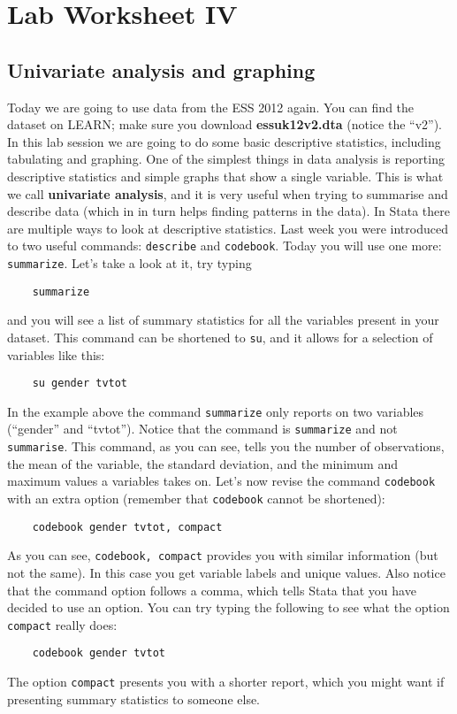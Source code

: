 \documentclass{article}
\begin{document}
\section*{\hfil Lab Worksheet IV \hfil}
\subsection*{Univariate analysis and graphing}

Today we are going to use data from the ESS 2012 again. You can find the dataset on LEARN; make sure you download \textbf{essuk12v2.dta} (notice the ``v2''). In this lab session we are going to do some basic descriptive statistics, including tabulating and graphing. One of the simplest things in data analysis is reporting descriptive statistics and simple graphs that show a single variable. This is what we call \textbf{univariate analysis}, and it is very useful when trying to summarise and describe data (which in in turn helps finding patterns in the data). In Stata there are multiple ways to look at descriptive statistics. Last week you were introduced to two useful commands: \texttt{describe} and \texttt{codebook}. Today you will use one more: \texttt{summarize}. Let’s take a look at it, try typing

\begin{lstlisting}
	summarize
\end{lstlisting} 

and you will see a list of summary statistics for all the variables present in your dataset. This command can be shortened to \texttt{su}, and it allows for a selection of variables like this:

\begin{lstlisting}
	su gender tvtot
\end{lstlisting}

In the example above the command \texttt{summarize} only reports on two variables (``gender'' and ``tvtot''). Notice that the command is \texttt{summarize} and not \texttt{summarise}. This command, as you can see, tells you the number of observations, the mean of the variable, the standard deviation, and the minimum and maximum values a variables takes on. Let's now revise the command \texttt{codebook} with an extra option (remember that \texttt{codebook} cannot be shortened):

\begin{lstlisting}
	codebook gender tvtot, compact
\end{lstlisting}

As you can see, \texttt{codebook, compact} provides you with similar information (but not the same). In this case you get variable labels and unique values. Also notice that the command option follows a comma, which tells Stata that you have decided to use an option. You can try typing the following to see what the option \texttt{compact} really does:

\begin{lstlisting}
	codebook gender tvtot
\end{lstlisting}

The option \texttt{compact} presents you with a shorter report, which you might want if presenting summary statistics to someone else.
\end{document}
